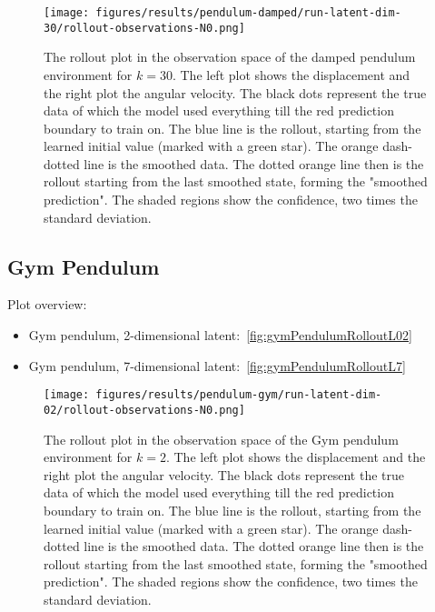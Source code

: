 		\begin{figure}
			\centering
			\texttt{[image: figures/results/pendulum-damped/run-latent-dim-30/rollout-observations-N0.png]}
			\caption[Rollout of the damped pendulum experiment for 30 latent dimensions]{The rollout plot in the observation space of the damped pendulum environment for \(k = 30\). The left plot shows the displacement and the right plot the angular velocity. The black dots represent the true data of which the model used everything till the red prediction boundary to train on. The blue line is the rollout, starting from the learned initial value (marked with a green star). The orange dash-dotted line is the smoothed data. The dotted orange line then is the rollout starting from the last smoothed state, forming the "smoothed prediction". The shaded regions show the confidence, \ie two times the standard deviation.}
			\label{fig:pendulumDampedRolloutL30}
		\end{figure}

	\subsection{Gym Pendulum}
		Plot overview:
		\begin{itemize}
			\item Gym pendulum, 2-dimensional latent:~\autoref{fig:gymPendulumRolloutL02}
			\item Gym pendulum, 7-dimensional latent:~\autoref{fig:gymPendulumRolloutL7}
		\end{itemize}

		\begin{figure}
			\centering
			\texttt{[image: figures/results/pendulum-gym/run-latent-dim-02/rollout-observations-N0.png]}
			\caption[Rollout of the Gym pendulum experiment for 2 latent dimensions]{The rollout plot in the observation space of the Gym pendulum environment for \(k = 2\). The left plot shows the displacement and the right plot the angular velocity. The black dots represent the true data of which the model used everything till the red prediction boundary to train on. The blue line is the rollout, starting from the learned initial value (marked with a green star). The orange dash-dotted line is the smoothed data. The dotted orange line then is the rollout starting from the last smoothed state, forming the "smoothed prediction". The shaded regions show the confidence, \ie two times the standard deviation.}
			\label{fig:gymPendulumRolloutL02}
		\end{figure}

